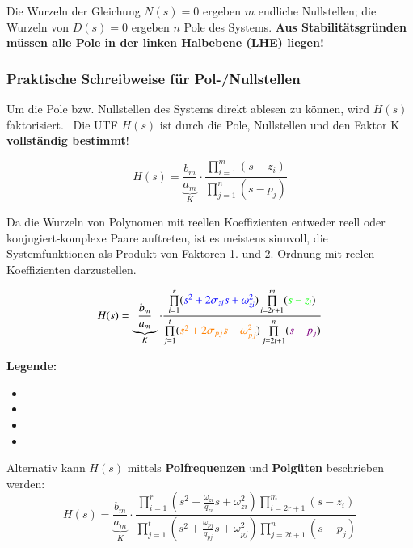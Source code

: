 Die Wurzeln der Gleichung $N(s) = 0$ ergeben $m$ endliche Nullstellen; die Wurzeln von $D(s) = 0$ ergeben $n$ Pole des Systems.
\textbf{Aus Stabilitätsgründen müssen alle Pole in der linken Halbebene (LHE) liegen!}


\subsubsection{Praktische Schreibweise für Pol-/Nullstellen}

Um die Pole bzw. Nullstellen des Systems direkt ablesen zu können, wird $H(s)$ faktorisiert. \textrightarrow\ Die UTF $H(s)$ ist durch
die Pole, Nullstellen und den Faktor K \textbf{vollständig bestimmt}!

$$ H(s) = \underbrace{\frac{b_m}{a_m}}_{K} \cdot \frac{\prod\limits_{i=1}^m (s - z_i)}{\prod\limits_{j=1}^n (s - p_j)} $$


Da die Wurzeln von Polynomen mit reellen Koeffizienten entweder reell oder konjugiert-komplexe Paare auftreten, ist es meistens
sinnvoll, die Systemfunktionen als Produkt von Faktoren 1. und 2. Ordnung mit reelen Koeffizienten darzustellen.

$$ H(s) = \underbrace{\frac{b_m}{a_m}}_{K} \cdot 
    \frac{\prod\limits_{i=1}^r ({\color{blue}s^2 + 2 \sigma_{zi} s + \omega_{zi}^2}) \prod\limits_{i=2r+1}^m ({\color{green}s - z_i})}
    {\prod\limits_{j=1}^t ({\color{orange}s^2 + 2 \sigma_{pj} s + \omega_{pj}^2}) \prod\limits_{j=2t+1}^n ({\color{violet}s - p_j})} $$

\textbf{Legende:}
\begin{itemize}
    \item {} 
    \item {}
    \item {} 
    \item {} 
\end{itemize}

\vspace{0.2cm}

Alternativ kann $H(s)$ mittels \textbf{Polfrequenzen} und \textbf{Polgüten} beschrieben werden:
$$ H(s) = \underbrace{\frac{b_m}{a_m}}_{K} \cdot 
    \frac{\prod\limits_{i=1}^r (s^2 + \frac{\omega_{zi}}{q_{zi}} s + \omega_{zi}^2) \prod\limits_{i=2r+1}^m (s - z_i)}
    {\prod\limits_{j=1}^t (s^2 +\frac{\omega_{pj}}{q_{pj}} s + \omega_{pj}^2) \prod\limits_{j=2t+1}^n (s - p_j)} $$

